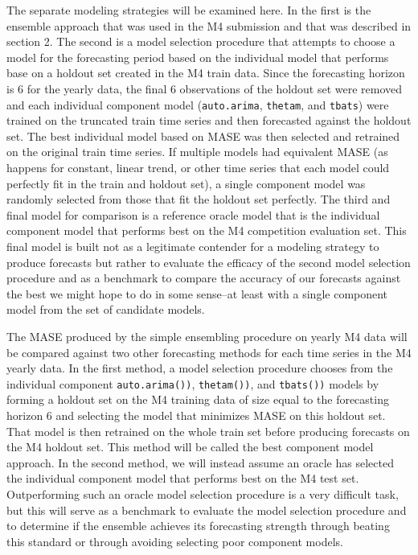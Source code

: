 \documentclass[11pt,3p,review,authoryear]{elsarticle}
\begin{document}
The separate modeling strategies will be examined here. In the first is the ensemble approach that was used in the M4 submission and that was described in section 2. The second is a model selection procedure that attempts to choose a model for the forecasting period based on the individual model that performs base on a holdout set created in the M4 train data. Since the forecasting horizon is 6 for the yearly data, the final 6 observations of the holdout set were removed and each individual component model (\texttt{auto.arima}, \texttt{thetam}, and \texttt{tbats}) were trained on the truncated train time series and then forecasted against the holdout set. The best individual model based on MASE was then selected and retrained on the original train time series. If multiple models had equivalent MASE (as happens for constant, linear trend, or other time series that each model could perfectly fit in the train and holdout set), a single component model was randomly selected from those that fit the holdout set perfectly. The third and final model for comparison is a reference oracle model that is the individual component model that performs best on the M4 competition evaluation set. This final model is built not as a legitimate contender for a modeling strategy to produce forecasts but rather to evaluate the efficacy of the second model selection procedure and as a benchmark to compare the accuracy of our forecasts against the best we might hope to do in some sense--at least with a single component model from the set of candidate models.

The MASE produced by the simple ensembling procedure on yearly M4 data will be compared against two other forecasting methods for each time series in the M4 yearly data. In the first method, a model selection procedure chooses from the individual component \texttt{auto.arima())}, \texttt{thetam())}, and \texttt{tbats())} models by forming a holdout set on the M4 training data of size equal to the forecasting horizon 6 and selecting the model that minimizes MASE on this holdout set. That model is then retrained on the whole train set before producing forecasts on the M4 holdout set. This method will be called the best component model approach. In the second method, we will instead assume an oracle has selected the individual component model that performs best on the M4 test set. Outperforming such an oracle model selection procedure is a very difficult task, but this will serve as a benchmark to evaluate the model selection procedure and to determine if the ensemble achieves its forecasting strength through beating this standard or through avoiding selecting poor component models.
\end{document}
